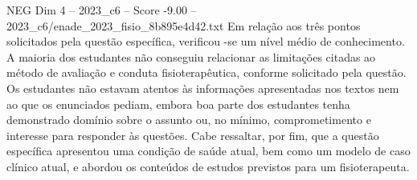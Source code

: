 \begin{textsample}{NEG Dim 4 – 2023\_c6 – Score -9.00 – 2023\_c6/enade\_2023\_fisio\_8b895e4d42.txt}
Em relação aos três pontos solicitados pela questão específica, verificou -se um nível médio de conhecimento.
A maioria dos estudantes não conseguiu relacionar as limitações citadas ao método de avaliação e conduta fisioterapêutica, conforme solicitado pela questão.
Os estudantes não estavam atentos às informações apresentadas nos textos nem ao que os enunciados pediam, embora boa parte dos estudantes tenha demonstrado domínio sobre o assunto ou, no mínimo, comprometimento e interesse para responder às questões.
Cabe ressaltar, por fim, que a questão específica apresentou uma condição de saúde atual, bem como um modelo de caso clínico atual, e abordou os conteúdos de estudos previstos para um fisioterapeuta.

\end{textsample}
